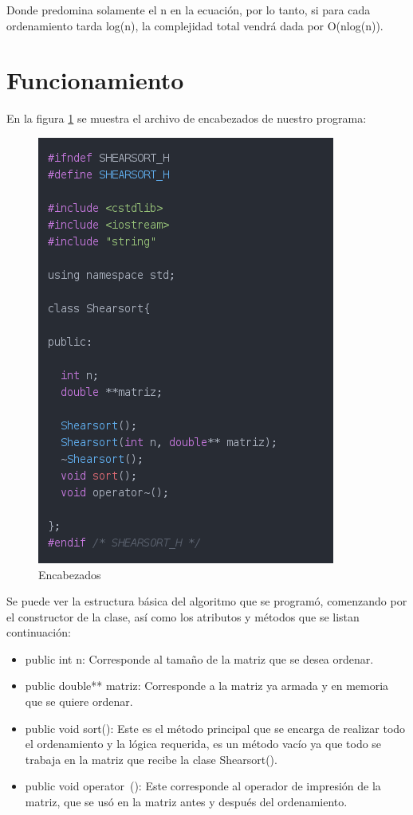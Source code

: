 \documentclass[11pt]{article}
\begin{document}
Donde predomina solamente el n en la ecuación, por lo tanto, si para cada ordenamiento tarda log(n), la complejidad total vendrá dada por O(nlog(n)).

\section{Funcionamiento}

En la figura \ref{fig:1} se muestra el archivo de encabezados de nuestro programa:

\begin{figure}[H]
\centering
\includegraphics[scale=0.8]{header.png}
\caption{Encabezados}
\label{fig:1}
\end{figure}
\newpage

Se puede ver la estructura básica del algoritmo que se programó, comenzando por el constructor de la clase, así como los atributos y métodos que se listan continuación:

\begin{itemize}
\item public int n: Corresponde al tamaño  de la matriz que se desea ordenar.
\item public double** matriz: Corresponde a la matriz ya armada y en memoria que se quiere ordenar.
\item public void sort(): Este es el método principal que se encarga de realizar todo el ordenamiento y la lógica requerida, es un método vacío ya que todo se trabaja en la matriz que recibe la clase Shearsort().
\item public void operator~(): Este corresponde al operador de impresión de la matriz, que se usó en la matriz antes y después del ordenamiento.
\end{itemize}
\end{document}
